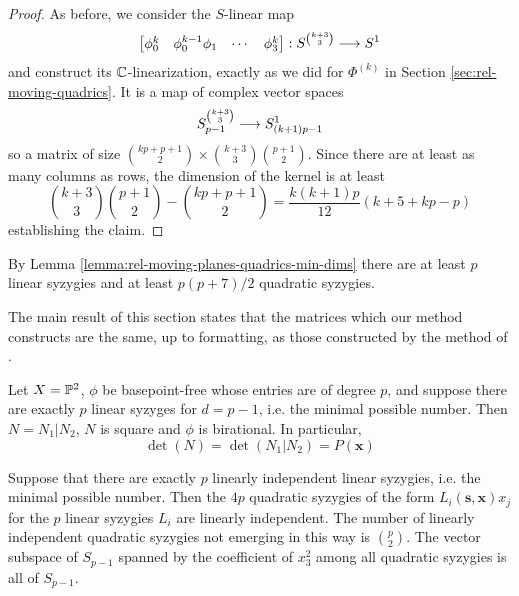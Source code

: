 \documentclass[fleqn,reqno]{amsart}
\begin{document}
\begin{proof}
	As before, we consider the $S$-linear map
	\[
		\begin{bmatrix}\phi_0^k& \phi_0^{k-1}\phi_1& \cdots& \phi_3^k\end{bmatrix}:
		S^{\binom{k+3}{3}}\longrightarrow S^1
	\]
	and construct its $\mathbb{C}$-linearization,
	exactly as we did for $\Phi^{(k)}$ in Section \ref{sec:rel-moving-quadrics}.
	It is a map of complex vector spaces
	\[
		S_{p-1}^{\binom{k+3}{3}}\longrightarrow S_{(k+1)p-1}^1
	\]
	so a matrix of size $\binom{kp+p+1}{2}\times\binom{k+3}{3}\binom{p+1}{2}$.
	Since there are at least as many columns as rows,
	the dimension of the kernel is at least
	\[
		\binom{k+3}{3}\binom{p+1}{2}-\binom{kp+p+1}{2}=\frac{k(k+1)p}{12}(k+5+kp-p)
	\]
	establishing the claim.
\end{proof}

\begin{remark}
	\label{rem:rel-moving-planes-quadrics-num-syz}
	By Lemma \ref{lemma:rel-moving-planes-quadrics-min-dims} there are
	at least $p$ linear syzygies and at least $p(p+7)/2$ quadratic syzygies.
\end{remark}

\begin{paragraph*}
	The main result of this section states that the matrices which our method constructs
	are the same, up to formatting, as those constructed by the method of \citet{00-CGZ-JSC}.
\end{paragraph*}

\begin{theorem}
	\label{thm:rel-moving-planes-quadrics}
	Let $X=\mathbb{P}^2$, $\phi$ be basepoint-free whose entries are of degree $p$,
	and suppose there are exactly $p$ linear syzyges for $d=p-1$, i.e. the minimal possible number.
	Then $N=N_1|N_2$, $N$ is square and $\phi$ is birational. In particular,
	\[
		\det(N)=\det(N_1|N_2)=P(\mathbf x)
	\]
\end{theorem}

\begin{lemma}
	\label{lemma:rel-moving-planes-quadrics-main}
	Suppose that there are exactly $p$ linearly independent linear syzygies, i.e. the minimal possible number.
	Then the $4p$ quadratic syzygies of the form $L_i(\mathbf s,\mathbf x)x_j$ for the $p$ linear syzygies $L_i$
	are linearly independent. The number of linearly independent quadratic syzygies not emerging in this way
	is $\binom{p}{2}$. The vector subspace of $S_{p-1}$ spanned by the coefficient of $x_3^2$ among all
	quadratic syzygies is all of $S_{p-1}$.
\end{lemma}
\end{document}
